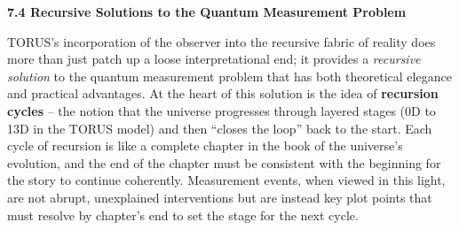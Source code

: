 \documentclass[
]{article}
\begin{document}
{\textbf{7.4 Recursive Solutions to the Quantum Measurement Problem}

TORUS's incorporation of the observer into the recursive fabric of
reality does more than just patch up a loose interpretational end; it
provides a \emph{recursive solution} to the quantum measurement problem
that has both theoretical elegance and practical advantages. At the
heart of this solution is the idea of \textbf{recursion cycles} -- the
notion that the universe progresses through layered stages (0D to 13D in
the TORUS model) and then ``closes the loop'' back to the start. Each
cycle of recursion is like a complete chapter in the book of the
universe's evolution, and the end of the chapter must be consistent with
the beginning for the story to continue coherently. Measurement events,
when viewed in this light, are not abrupt, unexplained interventions but
are instead key plot points that must resolve by chapter's end to set
the stage for the next cycle.

}
\end{document}
